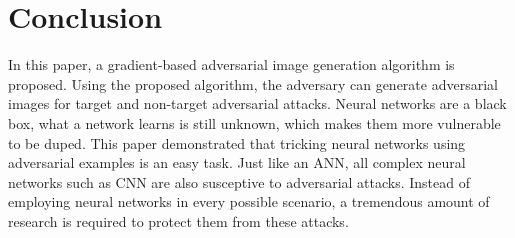 \section{Conclusion}

    In this paper, a gradient-based adversarial image generation algorithm is proposed. Using the proposed algorithm, the adversary can generate adversarial images for target and non-target adversarial attacks. Neural networks are a black box, what a network learns is still unknown, which makes them more vulnerable to be duped. This paper demonstrated that tricking neural networks using adversarial examples is an easy task. Just like an ANN, all complex neural networks such as CNN are also susceptive to adversarial attacks. Instead of employing neural networks in every possible scenario, a tremendous amount of research is required to protect them from these attacks. 
    